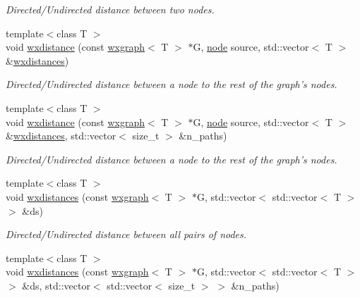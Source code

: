 \begin{DoxyCompactItemize}
\begin{DoxyCompactList}\small\item\em Directed/\-Undirected distance between two nodes. \end{DoxyCompactList}\item 
{\footnotesize template$<$class T $>$ }\\void \hyperlink{namespacelgraph_1_1traversal_ab270bbab26397a7a496d1afcf41e691e}{wxdistance} (const \hyperlink{classlgraph_1_1wxgraph}{wxgraph}$<$ T $>$ $\ast$G, \hyperlink{namespacelgraph_a397169dd66adf725210a30fb7251773e}{node} source, std\-::vector$<$ T $>$ \&\hyperlink{namespacelgraph_1_1traversal_ad93901449fffd98907c33422d5f92fda}{wxdistances})
\begin{DoxyCompactList}\small\item\em Directed/\-Undirected distance between a node to the rest of the graph's nodes. \end{DoxyCompactList}\item 
{\footnotesize template$<$class T $>$ }\\void \hyperlink{namespacelgraph_1_1traversal_acf69657edd299c3e49285f631593fc96}{wxdistance} (const \hyperlink{classlgraph_1_1wxgraph}{wxgraph}$<$ T $>$ $\ast$G, \hyperlink{namespacelgraph_a397169dd66adf725210a30fb7251773e}{node} source, std\-::vector$<$ T $>$ \&\hyperlink{namespacelgraph_1_1traversal_ad93901449fffd98907c33422d5f92fda}{wxdistances}, std\-::vector$<$ size\-\_\-t $>$ \&n\-\_\-paths)
\begin{DoxyCompactList}\small\item\em Directed/\-Undirected distance between a node to the rest of the graph's nodes. \end{DoxyCompactList}\item 
{\footnotesize template$<$class T $>$ }\\void \hyperlink{namespacelgraph_1_1traversal_ad93901449fffd98907c33422d5f92fda}{wxdistances} (const \hyperlink{classlgraph_1_1wxgraph}{wxgraph}$<$ T $>$ $\ast$G, std\-::vector$<$ std\-::vector$<$ T $>$ $>$ \&ds)
\begin{DoxyCompactList}\small\item\em Directed/\-Undirected distance between all pairs of nodes. \end{DoxyCompactList}\item 
{\footnotesize template$<$class T $>$ }\\void \hyperlink{namespacelgraph_1_1traversal_af883f4e22b53a8ebad2710acf88ae0d3}{wxdistances} (const \hyperlink{classlgraph_1_1wxgraph}{wxgraph}$<$ T $>$ $\ast$G, std\-::vector$<$ std\-::vector$<$ T $>$ $>$ \&ds, std\-::vector$<$ std\-::vector$<$ size\-\_\-t $>$ $>$ \&n\-\_\-paths)

\end{DoxyCompactItemize}
